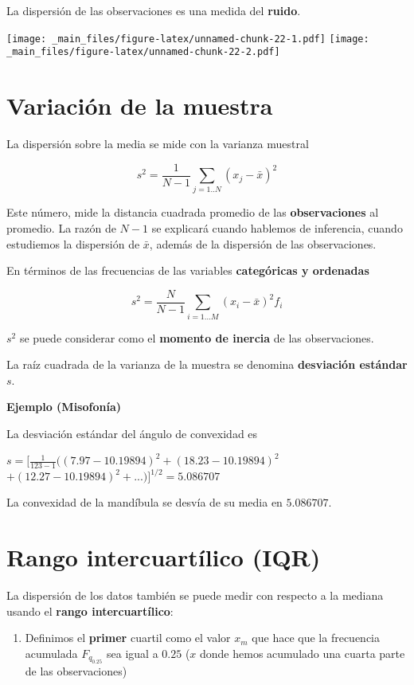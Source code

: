 \documentclass[
]{book}
\providecommand{\tightlist}{%
  \setlength{\itemsep}{0pt}\setlength{\parskip}{0pt}}
\begin{document}
La dispersión de las observaciones es una medida del \textbf{ruido}.

\texttt{[image: \_main\_files/figure-latex/unnamed-chunk-22-1.pdf]} \texttt{[image: \_main\_files/figure-latex/unnamed-chunk-22-2.pdf]}

\hypertarget{variaciuxf3n-de-la-muestra}{%
\section{Variación de la muestra}\label{variaciuxf3n-de-la-muestra}}

La dispersión sobre la media se mide con la varianza muestral

\[s^2=\frac{1}{N-1} \sum_{j=1..N} (x_j-\bar{x})^2\]

Este número, mide la distancia cuadrada promedio de las \textbf{observaciones} al promedio. La razón de \(N-1\) se explicará cuando hablemos de inferencia, cuando estudiemos la dispersión de \(\bar{x}\), además de la dispersión de las observaciones.

En términos de las frecuencias de las variables \textbf{categóricas y ordenadas}

\[s^2=\frac{N}{N-1} \sum_{i=1... M} (x_i-\bar{x})^2 f_i\]

\(s^2\) se puede considerar como el \textbf{momento de inercia} de las observaciones.

La raíz cuadrada de la varianza de la muestra se denomina \textbf{desviación estándar} \(s\).

\textbf{Ejemplo (Misofonía)}

La desviación estándar del ángulo de convexidad es

\(s= [\frac{1}{123-1}((7.97-10.19894)^2+ (18.23-10.19894)^2\)
\(+ (12.27-10.19894)^2 + ...)]^{1/2} = 5.086707\)

La convexidad de la mandíbula se desvía de su media en \(5.086707\).

\hypertarget{rango-intercuartuxedlico-iqr}{%
\section{Rango intercuartílico (IQR)}\label{rango-intercuartuxedlico-iqr}}

La dispersión de los datos también se puede medir con respecto a la mediana usando el \textbf{rango intercuartílico}:

\begin{enumerate}
\def\labelenumi{\arabic{enumi})}
\tightlist
\item
  Definimos el \textbf{primer} cuartil como el valor \(x_m\) que hace que la frecuencia acumulada \(F_{q_{0.25}}\) sea igual a \(0.25\) (\(x\) donde hemos acumulado una cuarta parte de las observaciones)
\end{enumerate}
\end{document}
